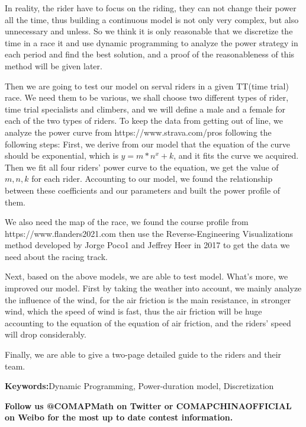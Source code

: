 \documentclass[12pt]{article}
\begin{document}
In reality, the rider have to focus on the riding, they can not change their power all the time, thus building a continuous model is not only very complex,
but also unnecessary and unless. So we think it is only reasonable that we discretize the time in a race  it and use dynamic programming to analyze the power strategy in each
period and find the best solution, and a proof of the reasonableness of this method will be given later.

Then we are going to test our model on serval riders in a given TT(time trial) race. We need them to be various, we shall choose two different types of rider, time trial
specialists and climbers, and we will define a male and a female for each of the two types of riders. To keep the data from getting out of line, we analyze the power curve
from https://www.strava.com/pros following the following steps:
First, we derive from our model that the equation of the curve should be exponential, which is $y=m*n^x+k$, and it fits the curve we acquired.
Then we fit all four riders' power curve to the equation, we get the value of $m,n,k$ for each rider. Accounting to our model, we found the relationship between these
coefficients and our parameters and built the power profile of them.

We also need the map of the race, we found the course profile from https://www.flanders2021.com
then use the Reverse-Engineering Visualizations method developed by Jorge Poco1 and Jeffrey Heer in 2017\cite{poco2017reverse} to get the data we need about the racing track.

Next, based on the above models, we are able to test model. What's more, we improved our model. First by taking the weather into account, we mainly analyze the influence of the
wind, for the air friction is the main resistance, in stronger wind, which the speed of wind is fast, thus the air friction will be huge accounting to the equation of the
equation of air friction, and the riders' speed will drop considerably.

Finally, we are able to  give a two-page detailed guide to the riders and their team.
\begin{center}
    \textbf{Keywords:}\Large Dynamic Programming, Power-duration model, Discretization

\end{center}
\textbf{Follow us @COMAPMath on Twitter or COMAPCHINAOFFICIAL on Weibo for the \newline
    most up to date contest information.}
\end{document}
